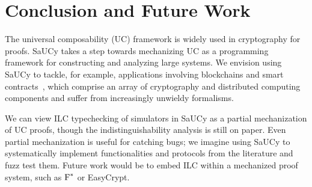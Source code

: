 \section{Conclusion and Future Work}
\label{sec:conclusion}

The universal composability (UC) framework is widely used in cryptography
for proofs.
SaUCy takes a step towards mechanizing UC as a programming
framework for constructing and analyzing large systems.
%
%
We envision using SaUCy to tackle, for example, applications involving blockchains and smart contracts~\cite{dziembowski2018general,miller2017sprites,dziembowski2017perun}, which comprise an array of cryptography and distributed computing components and suffer from increasingly unwieldy formalisms.

We can view ILC typechecking of simulators in SaUCy as a partial
mechanization of UC proofs, though the indistinguishability analysis
is still on paper.
Even partial mechanization is useful for catching
bugs; we imagine using SaUCy to systematically implement
functionalities and protocols from the literature and fuzz test
them.
Future work would be to embed ILC within a mechanized proof system,
such as $\textnormal{F}^{*}$ or EasyCrypt.

